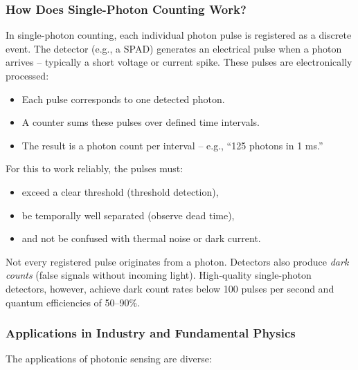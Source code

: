 \subsubsection*{How Does Single-Photon Counting Work?}
In single-photon counting, each individual photon pulse is registered as a discrete event. The detector (e.g., a SPAD) generates an electrical pulse when a photon arrives – typically a short voltage or current spike. These pulses are electronically processed:

\begin{itemize}
	\item Each pulse corresponds to one detected photon.
	\item A counter sums these pulses over defined time intervals.
	\item The result is a photon count per interval – e.g., “125 photons in 1 ms.”
\end{itemize}

For this to work reliably, the pulses must:
\begin{itemize}
	\item exceed a clear threshold (threshold detection),
	\item be temporally well separated (observe dead time),
	\item and not be confused with thermal noise or dark current.
\end{itemize}
\vspace{1em}
\begin{tcolorbox}[didaktikbox, title=What Counts as a Photon? ]
	\label{box:photonenzaehlung}
	\small
	Not every registered pulse originates from a photon. Detectors also produce \emph{dark counts} (false signals without incoming light). High-quality single-photon detectors, however, achieve dark count rates below 100 pulses per second and quantum efficiencies of 50–90\%.
\end{tcolorbox}

\subsubsection{Applications in Industry and Fundamental Physics}

The applications of photonic sensing are diverse:


